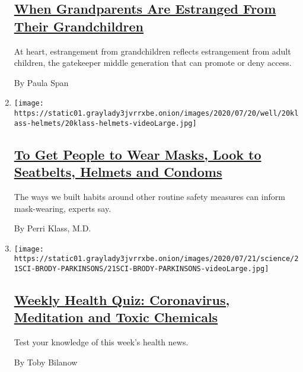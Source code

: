 \begin{enumerate}
  \hypertarget{when-grandparents-are-estranged-from-their-grandchildren}{%
  \subsection{\texorpdfstring{\href{/2020/07/23/well/family/estrangement-grandparents-grandchildren.html}{When
  Grandparents Are Estranged From Their
  Grandchildren}}{When Grandparents Are Estranged From Their Grandchildren}}\label{when-grandparents-are-estranged-from-their-grandchildren}}

  At heart, estrangement from grandchildren reflects estrangement from
  adult children, the gatekeeper middle generation that can promote or
  deny access.

  By Paula Span
\item
  \texttt{[image: https://static01.graylady3jvrrxbe.onion/images/2020/07/20/well/20klass-helmets/20klass-helmets-videoLarge.jpg]}

  \hypertarget{to-get-people-to-wear-masks-look-to-seatbelts-helmets-and-condoms}{%
  \subsection{\texorpdfstring{\href{/2020/07/21/well/family/masks-condoms-seatbelts-helmets.html}{To
  Get People to Wear Masks, Look to Seatbelts, Helmets and
  Condoms}}{To Get People to Wear Masks, Look to Seatbelts, Helmets and Condoms}}\label{to-get-people-to-wear-masks-look-to-seatbelts-helmets-and-condoms}}

  The ways we built habits around other routine safety measures can
  inform mask-wearing, experts say.

  By Perri Klass, M.D.
\item
  \texttt{[image: https://static01.graylady3jvrrxbe.onion/images/2020/07/21/science/21SCI-BRODY-PARKINSONS/21SCI-BRODY-PARKINSONS-videoLarge.jpg]}

  \hypertarget{weekly-health-quiz-coronavirus-meditation-and-toxic-chemicals}{%
  \subsection{\texorpdfstring{\href{/interactive/2020/07/24/well/live/24healthquiz-07242020.html}{Weekly
  Health Quiz: Coronavirus, Meditation and Toxic
  Chemicals}}{Weekly Health Quiz: Coronavirus, Meditation and Toxic Chemicals}}\label{weekly-health-quiz-coronavirus-meditation-and-toxic-chemicals}}

  Test your knowledge of this week's health news.

  By Toby Bilanow
\end{enumerate}

